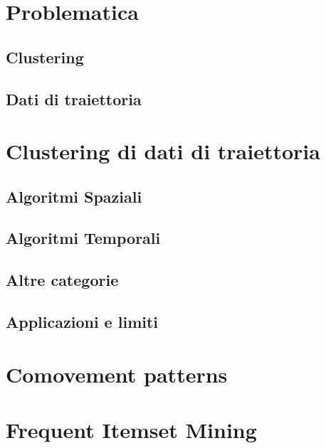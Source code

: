 
\section{Problematica}\label{sec:problem}


\subsection{Clustering}\label{subsec:problem:clustering}


\subsection{Dati di traiettoria}\label{subsec:problem:trajectorydata}


\section{Clustering di dati di traiettoria}\label{sec:problem:trajectoryclustering}


\subsection{Algoritmi Spaziali}\label{subsec:problem:spatialalgorithms}


\subsection{Algoritmi Temporali}\label{subsec:problem:temporalalgorithms}


\subsection{Altre categorie}\label{subsec:problem:othersalgorithms}


\subsection{Applicazioni e limiti}\label{subsec:problem:applicationandlimits}


\section{Comovement patterns}\label{sec:problem:comovements-pattern}

\section{Frequent Itemset Mining}\label{sec:problem:frequent-itemset-mining}

